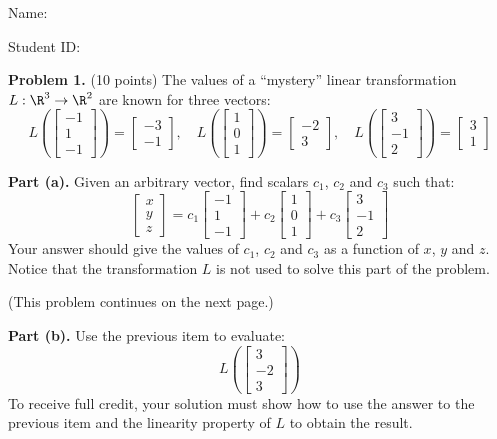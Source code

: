 \documentclass[12pt]{article}
\begin{document}
Name: \hrulefill

\bigskip
Student ID: \hrulefill


\textbf{Problem 1.} (10 points)
The values of a ``mystery'' linear transformation $L:\R^3\to\R^2$ are known for three vectors:
\[
L\left(\left[\begin{matrix}-1\\1\\-1\end{matrix}\right]\right)=\left[\begin{matrix}-3\\-1\end{matrix}\right],\quad 
L\left(\left[\begin{matrix}1\\0\\1\end{matrix}\right]\right)=\left[\begin{matrix}-2\\3\end{matrix}\right],\quad 
L\left(\left[\begin{matrix}3\\-1\\2\end{matrix}\right]\right)=\left[\begin{matrix}3\\1\end{matrix}\right]
\]

\textbf{Part (a).} Given an arbitrary vector, find scalars $c_1$, $c_2$ and $c_3$ such that:
\[
\begin{bmatrix}x\\y\\z\end{bmatrix}=c_1\left[\begin{matrix}-1\\1\\-1\end{matrix}\right]+c_2\left[\begin{matrix}1\\0\\1\end{matrix}\right]+c_3\left[\begin{matrix}3\\-1\\2\end{matrix}\right]
\]
Your answer should give the values of $c_1$, $c_2$ and $c_3$ as a function of $x$, $y$ and $z$. Notice that the transformation $L$ is not used to solve this part of the problem.

\vfill
(This problem continues on the next page.)

\clearpage

\textbf{Part (b).} Use the previous item to evaluate:
\[
L\left(\left[\begin{matrix}3\\-2\\3\end{matrix}\right]\right)
\]
To receive full credit, your solution must show how to use the answer to the previous item and the linearity property of $L$ to obtain the result. 
\end{document}
